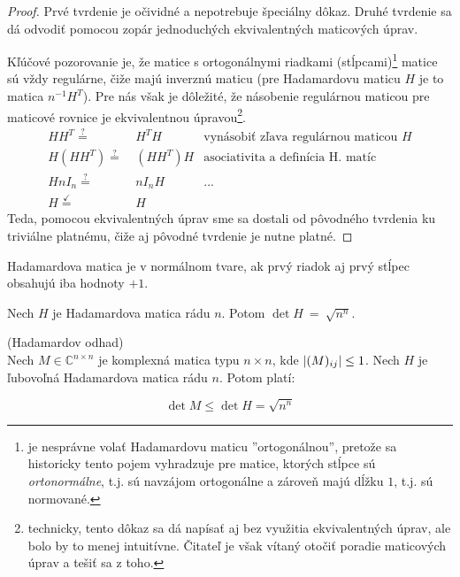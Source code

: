 \begin{toreview}
\begin{proof}
Prvé tvrdenie je očividné a nepotrebuje špeciálny dôkaz.
Druhé tvrdenie sa dá odvodiť pomocou zopár jednoduchých ekvivalentných maticových úprav.

Kľúčové pozorovanie je, že matice s ortogonálnymi riadkami (stĺpcami)\footnote{je nesprávne volať Hadamardovu maticu ''ortogonálnou'', pretože sa historicky tento pojem vyhradzuje pre matice, ktorých stĺpce sú \emph{ortonormálne}, t.j. sú navzájom ortogonálne a zároveň majú dĺžku $1$, t.j. sú normované.} matice sú vždy regulárne, čiže majú inverznú maticu (pre Hadamardovu maticu $H$ je to matica $n^{-1} H^T$).
Pre nás však je dôležité, že násobenie regulárnou maticou pre maticové rovnice je ekvivalentnou úpravou\footnote{technicky, tento dôkaz sa dá napísať aj bez využitia ekvivalentných úprav, ale bolo by to menej intuitívne. Čitateľ je však vítaný otočiť poradie maticových úprav a tešiť sa z toho.}.
\begin{align*}
    HH^T \overset{?}{=}&~ H^TH&\text{vynásobiť zľava regulárnou maticou $H$}\\
    H(HH^T) \overset{?}{=}&~ (HH^T)H&\text{asociativita a definícia H. matíc}\\
    HnI_n \overset{?}{=}&~ nI_nH&\text{...}\\
    H \overset{\checkmark}{=}&~ H&\text{}
\end{align*}
Teda, pomocou ekvivalentných úprav sme sa dostali od pôvodného tvrdenia ku triviálne platnému, čiže aj pôvodné tvrdenie je nutne platné.
\end{proof}
\end{toreview}

\begin{definition}
Hadamardova matica je v normálnom tvare, ak prvý riadok aj prvý stĺpec obsahujú iba hodnoty $+1$.
\end{definition}

\begin{theorem_hard}

Nech $H$ je Hadamardova matica rádu $n$. Potom $\det{H}~=~\sqrt{n^n}$.

\end{theorem_hard}

\begin{theorem_hard}{(Hadamardov odhad)}\\
Nech $M \in \mathbb{C}^{n\times n}$ je komplexná matica typu $n\times n$, kde $\left|(M)_{ij}\right| \leq 1$. 
Nech $H$ je ľubovoľná Hadamardova matica rádu $n$.
Potom platí:

$$\det{M} \leq \det{H} = \sqrt{n^n}$$

\end{theorem_hard}

